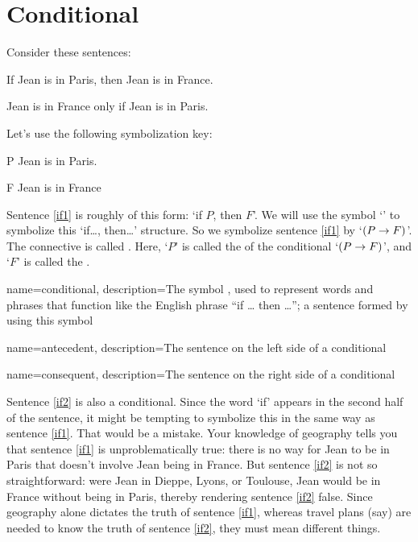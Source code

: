 \section{Conditional}
Consider these sentences:
	\begin{earg}
		\item[\ex{if1}] If Jean is in Paris, then Jean is in France.
		\item[\ex{if2}] Jean is in France only if Jean is in Paris.
	\end{earg}
Let's use the following symbolization key:
	\begin{ekey}
		\item[P] Jean is in Paris.
		\item[F] Jean is in France
	\end{ekey}
Sentence \ref{if1} is roughly of this form: `if $P$, then $F$'. We will use the symbol `\eif' to symbolize this `if\ldots, then\ldots' structure. So we symbolize sentence \ref{if1} by `$(P\rightarrow F)$'. The connective is called . Here, `$P$' is called the  of the conditional `$(P \rightarrow F)$', and `$F$' is called the .

{
name=conditional,
description={The symbol \eif, used to represent words and phrases that function like the English phrase ``if \dots{} then \dots''; a sentence formed by using this symbol}
}

{
name=antecedent,
description={The sentence on the left side of a \gls{conditional}}
}


{
name=consequent,
description={The sentence on the right side of a \gls{conditional}}
}

Sentence \ref{if2} is also a conditional. Since the word `if' appears in the second half of the sentence, it might be tempting to symbolize this in the same way as sentence \ref{if1}. That would be a mistake. Your knowledge of geography tells you that sentence \ref{if1} is unproblematically true: there is no way for Jean to be in Paris that doesn't involve Jean being in France. But sentence \ref{if2} is not so straightforward: were  Jean in Dieppe, Lyons, or Toulouse, Jean would be in France without being in Paris, thereby rendering sentence \ref{if2} false. Since geography alone dictates the truth of sentence \ref{if1}, whereas travel plans (say) are needed to know the truth of sentence \ref{if2}, they must mean different things.

